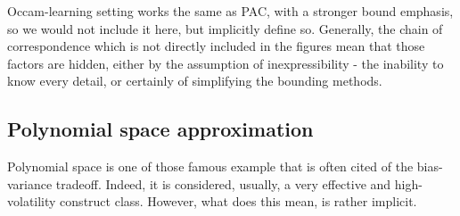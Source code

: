 \documentclass[10pt]{article}
\begin{document}
Occam-learning setting works the same as PAC, with a stronger bound emphasis, so we would not include it here, but implicitly define so. Generally, the chain of correspondence which is not directly included in the figures mean that those factors are hidden, either by the assumption of inexpressibility - the inability to know every detail, or certainly of simplifying the bounding methods. 

\subsection{Polynomial space approximation}

Polynomial space is one of those famous example that is often cited of the bias-variance tradeoff. Indeed, it is considered, usually, a very effective and high-volatility construct class. However, what does this mean, is rather implicit. 
\end{document}
